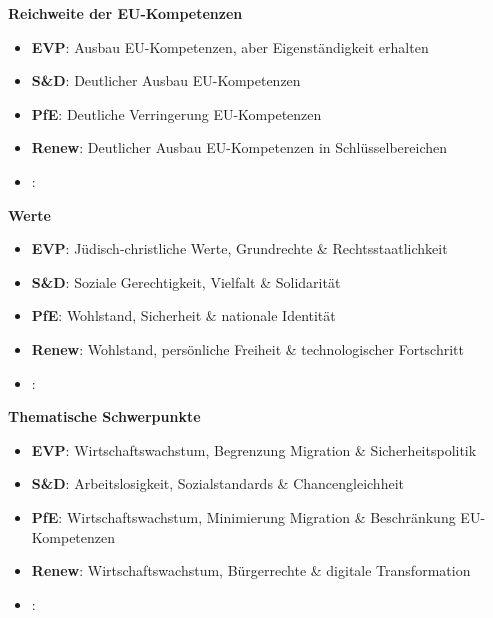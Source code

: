 \documentclass[11pt]{article}
\newcommand{\fifthGenOne}{\small \SharedIdeologyOne{Green}}
\newcommand{\fifthGenTwo}{\small \SharedIdeologyTwo{Green}}
\newcommand{\fifthGenThree}{\small \SharedIdeologyThree{Green}}
\newcommand{\fifthGenOne}{\small \SharedIdeologyOne{Green}}
\newcommand{\fifthGenTwo}{\small \SharedIdeologyTwo{Green}}
\newcommand{\fifthGenThree}{\small \SharedIdeologyThree{Green}}
\newcommand{\fifthGenOne}{\small \SharedIdeologyOne{Green}}
\newcommand{\fifthGenTwo}{\small \SharedIdeologyTwo{Green}}
\newcommand{\fifthGenThree}{\small \SharedIdeologyThree{Green}}
\newcommand{\fifthGenOne}{\small \SharedIdeologyOne{Linke}}
\newcommand{\fifthGenTwo}{\small \SharedIdeologyTwo{Linke}}
\newcommand{\fifthGenThree}{\small \SharedIdeologyThree{Linke}}
\begin{document}
\PlaceLogosRest

\vspace*{1cm}


\begin{minipage}[t]{0.45\textwidth}
    \textbf{\Large Reichweite der EU-Kompetenzen}
    \raggedright
    \begin{itemize}
        \item \textbf{EVP}: {\small Ausbau EU-Kompetenzen, aber Eigenständigkeit erhalten}
        \item \textbf{S\&D}: {\small Deutlicher Ausbau EU-Kompetenzen}
        \item \textbf{PfE}: {\small Deutliche Verringerung EU-Kompetenzen}
        \item \textbf{Renew}: {\small Deutlicher Ausbau EU-Kompetenzen in Schlüsselbereichen}
        \item \textbf{\fifthGroup}: \fifthGenOne
    \end{itemize}
    \textbf{\Large Werte}
    \raggedright
    \begin{itemize}
        \item \textbf{EVP}: {\small Jüdisch-christliche Werte, Grundrechte \& Rechtsstaatlichkeit}
        \item \textbf{S\&D}: {\small Soziale Gerechtigkeit, Vielfalt \& Solidarität}
        \item \textbf{PfE}: {\small Wohlstand, Sicherheit \& nationale Identität}
        \item \textbf{Renew}: {\small Wohlstand, persönliche Freiheit \& technologischer Fortschritt}
        \item \textbf{\fifthGroup}: \fifthGenTwo
    \end{itemize}
    \textbf{\Large Thematische Schwerpunkte}
    \raggedright
    \begin{itemize}
        \item \textbf{EVP}: {\small Wirtschaftswachstum, Begrenzung Migration \& Sicherheitspolitik}
        \item \textbf{S\&D}: {\small Arbeitslosigkeit, Sozialstandards \& Chancengleichheit}
        \item \textbf{PfE}: {\small Wirtschaftswachstum, Minimierung Migration \& Beschränkung EU-Kompetenzen}
        \item \textbf{Renew}: {\small Wirtschaftswachstum, Bürgerrechte \& digitale Transformation}
        \item \textbf{\fifthGroup}: \fifthGenThree
    \end{itemize}
    
\end{minipage}%
\end{document}
